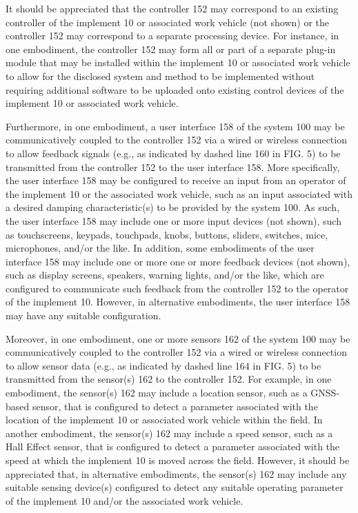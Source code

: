 \documentclass[11pt,a4paper]{article}
\begin{document}
It should be appreciated that the controller 152 may correspond to an existing controller of the implement 10 or associated work vehicle (not shown) or the controller 152 may correspond to a separate processing device. For instance, in one embodiment, the controller 152 may form all or part of a separate plug-in module that may be installed within the implement 10 or associated work vehicle to allow for the disclosed system and method to be implemented without requiring additional software to be uploaded onto existing control devices of the implement 10 or associated work vehicle.

Furthermore, in one embodiment, a user interface 158 of the system 100 may be communicatively coupled to the controller 152 via a wired or wireless connection to allow feedback signals (e.g., as indicated by dashed line 160 in FIG. 5) to be transmitted from the controller 152 to the user interface 158. More specifically, the user interface 158 may be configured to receive an input from an operator of the implement 10 or the associated work vehicle, such as an input associated with a desired damping characteristic(s) to be provided by the system 100. As such, the user interface 158 may include one or more input devices (not shown), such as touchscreens, keypads, touchpads, knobs, buttons, sliders, switches, mice, microphones, and/or the like. In addition, some embodiments of the user interface 158 may include one or more one or more feedback devices (not shown), such as display screens, speakers, warning lights, and/or the like, which are configured to communicate such feedback from the controller 152 to the operator of the implement 10. However, in alternative embodiments, the user interface 158 may have any suitable configuration.

Moreover, in one embodiment, one or more sensors 162 of the system 100 may be communicatively coupled to the controller 152 via a wired or wireless connection to allow sensor data (e.g., as indicated by dashed line 164 in FIG. 5) to be transmitted from the sensor(s) 162 to the controller 152. For example, in one embodiment, the sensor(s) 162 may include a location sensor, such as a GNSS-based sensor, that is configured to detect a parameter associated with the location of the implement 10 or associated work vehicle within the field. In another embodiment, the sensor(s) 162 may include a speed sensor, such as a Hall Effect sensor, that is configured to detect a parameter associated with the speed at which the implement 10 is moved across the field. However, it should be appreciated that, in alternative embodiments, the sensor(s) 162 may include any suitable sensing device(s) configured to detect any suitable operating parameter of the implement 10 and/or the associated work vehicle.
\end{document}
